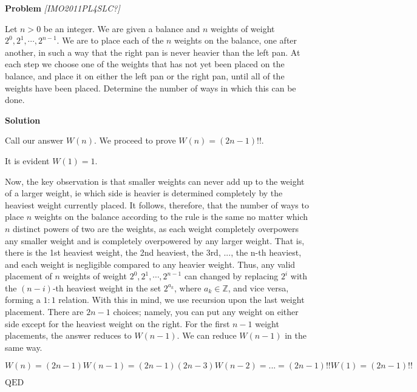 \begin{problem}



\textbf{Problem}
\textit{[IMO2011PL4SLC?]}


Let $n > 0$ be an integer. We are given a balance and $n$ weights of weight $2^0,2^1, \cdots ,2^{n-1}$. We are to place each of the $n$ weights on the balance, one after another, in such a way that the right pan is never heavier than the left pan. At each step we choose one of the weights that has not yet been placed on the balance, and place it on either the left pan or the right pan, until all of the weights have been placed. Determine the number of ways in which this can be done.

\textbf{Solution}

Call our answer $W(n)$. We proceed to prove $W(n)=(2n-1)!!$.

It is evident $W(1)=1$.

Now, the key observation is that smaller weights can never add up to the weight of a larger weight, ie which side is heavier is determined completely by the heaviest weight currently placed. It follows, therefore, that the number of ways to place $n$ weights on the balance according to the rule is the same no matter which $n$ distinct powers of two are the weights, as each weight completely overpowers any smaller weight and is completely overpowered by any larger weight. That is, there is the 1st heaviest weight, the 2nd heaviest, the 3rd, ..., the n-th heaviest, and each weight is negligible compared to any heavier weight. Thus, any valid placement of $n$ weights of weight $2^0,2^1, \cdots ,2^{n-1}$ can changed by replacing $2^i$ with the $(n-i)$-th heaviest weight in the set ${2^{a_k}}$, where $a_k \in \mathbb{Z}$, and vice versa, forming a $1:1$ relation. With this in mind, we use recursion upon the last weight placement. There are $2n-1$ choices; namely, you can put any weight on either side except for the heaviest weight on the right. For the first $n-1$ weight placements, the answer reduces to $W(n-1)$. We can reduce $W(n-1)$ in the same way.

$W(n)=(2n-1)W(n-1)=(2n-1)(2n-3)W(n-2)=...=(2n-1)!!W(1)=(2n-1)!!$


$\text{QED}$
\end{problem}
\filbreak
